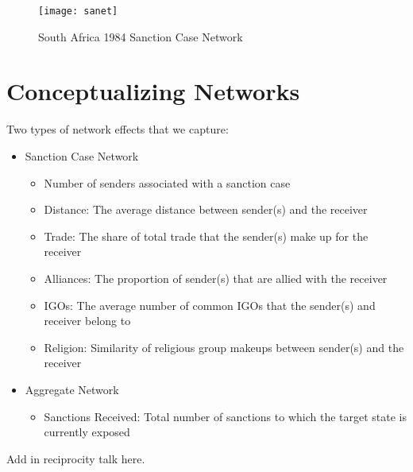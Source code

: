 \begin{figure}[ht]
	\centering
	\texttt{[image: sanet]}
	\caption{South Africa 1984 Sanction Case Network}
\end{figure}

\section{Conceptualizing Networks}
Two types of network effects that we capture:

\begin{itemize}
	\item Sanction Case Network
	\begin{itemize}
		\item Number of senders associated with a sanction case
		\item Distance: The average distance between sender(s) and the receiver
		\item Trade: The share of total trade that the sender(s) make up for the receiver		
		\item Alliances: The proportion of sender(s) that are allied with the receiver
		\item IGOs: The average number of common IGOs that the sender(s) and receiver belong to
		\item Religion: Similarity of religious group makeups between sender(s) and the receiver
	\end{itemize}
	\item Aggregate Network
	\begin{itemize}
		\item Sanctions Received: Total number of sanctions to which the target state is currently exposed
	\end{itemize}
\end{itemize}

Add in reciprocity talk here. 